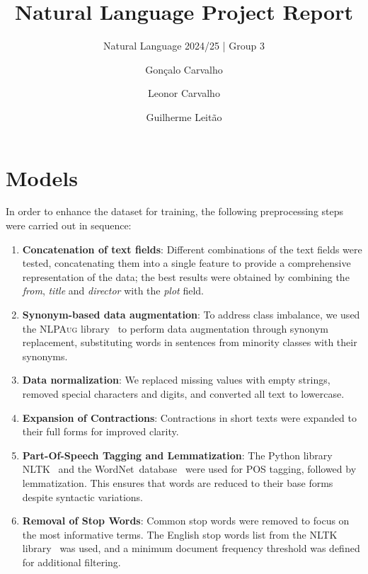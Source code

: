 \documentclass[3pt, sigconf, nonacm]{acmart}
\begin{document}
\title{Natural Language Project Report}
\subtitle{Natural Language 2024/25 | Group 3}

\author{Gonçalo Carvalho}

\author{Leonor Carvalho}

\author{Guilherme Leitão}
\renewcommand{\shortauthors}{Natural Language | Group 2}



\maketitle

\section{Models}
\setlength{\parindent}{0pt}

In order to enhance the dataset for training, the following preprocessing steps were carried out in sequence:

\begin{enumerate}
    \item \textbf{Concatenation of text fields}: Different combinations of the text fields were tested, concatenating them into a single feature to provide a comprehensive representation of the data; the best results were obtained by combining the \textit{from}, \textit{title} and \textit{director} with the \textit{plot} field.
    \item \textbf{Synonym-based data augmentation}: To address class imbalance, we used the    \textsc{NLPAug} library~\cite{ma2019nlpaug} to perform data augmentation through synonym replacement, substituting words in sentences from minority classes with their synonyms.
    \item \textbf{Data normalization}: We replaced missing values with empty strings, removed special characters and digits, and converted all text to lowercase.
    \item \textbf{Expansion of Contractions}: Contractions in short texts were expanded to their full forms for improved clarity.
    \item \textbf{Part-Of-Speech Tagging and Lemmatization}: The Python library \textsc{NLTK}~\cite{bird2009natural} and the WordNet\textregistered ~database~\cite{miller-1994-wordnet} were used for POS tagging, followed by lemmatization.
    This ensures that words are reduced to their base forms despite syntactic variations.
    \item \textbf{Removal of Stop Words}: Common stop words were removed to focus on the most informative terms. The English stop words list from the \textsc{NLTK} library~\cite{bird2009natural} was used, and a minimum document frequency threshold was defined for additional filtering.
\end{enumerate}
\end{document}
